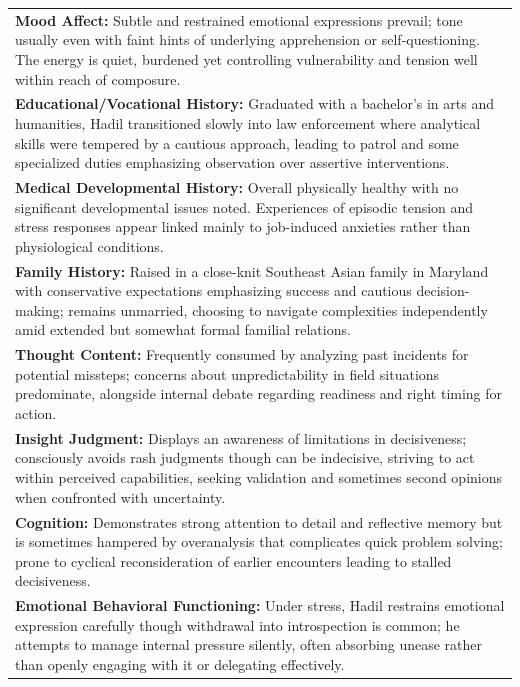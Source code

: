 \documentclass[11pt]{article}
\begin{document}
\begin{table}[ht]
\begin{tabularx}{\textwidth}{X}
\textbf{Mood Affect:} Subtle and restrained emotional expressions prevail; tone usually even with faint hints of underlying apprehension or self-questioning. The energy is quiet, burdened yet controlling vulnerability and tension well within reach of composure. \\[4pt]

\textbf{Educational/Vocational History:} Graduated with a bachelor’s in arts and humanities, Hadil transitioned slowly into law enforcement where analytical skills were tempered by a cautious approach, leading to patrol and some specialized duties emphasizing observation over assertive interventions. \\[4pt]

\textbf{Medical Developmental History:} Overall physically healthy with no significant developmental issues noted. Experiences of episodic tension and stress responses appear linked mainly to job-induced anxieties rather than physiological conditions. \\[4pt]

\textbf{Family History:} Raised in a close-knit Southeast Asian family in Maryland with conservative expectations emphasizing success and cautious decision-making; remains unmarried, choosing to navigate complexities independently amid extended but somewhat formal familial relations. \\[4pt]

\textbf{Thought Content:} Frequently consumed by analyzing past incidents for potential missteps; concerns about unpredictability in field situations predominate, alongside internal debate regarding readiness and right timing for action. \\[4pt]

\textbf{Insight Judgment:} Displays an awareness of limitations in decisiveness; consciously avoids rash judgments though can be indecisive, striving to act within perceived capabilities, seeking validation and sometimes second opinions when confronted with uncertainty. \\[4pt]

\textbf{Cognition:} Demonstrates strong attention to detail and reflective memory but is sometimes hampered by overanalysis that complicates quick problem solving; prone to cyclical reconsideration of earlier encounters leading to stalled decisiveness. \\[4pt]

\textbf{Emotional Behavioral Functioning:} Under stress, Hadil restrains emotional expression carefully though withdrawal into introspection is common; he attempts to manage internal pressure silently, often absorbing unease rather than openly engaging with it or delegating effectively. \\[4pt]


\end{tabularx}
\end{table}
\end{document}
